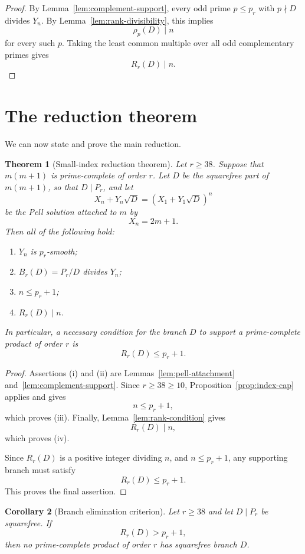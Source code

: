 \documentclass[11pt]{article}
\newtheorem{theorem}{Theorem}[section]
\newtheorem{corollary}[theorem]{Corollary}
\theoremstyle{definition}
\begin{document}
\begin{proof}
By Lemma~\ref{lem:complement-support}, every odd prime $p\le p_r$ with $p\nmid D$ 
divides $Y_n$.  By Lemma~\ref{lem:rank-divisibility}, this implies
\[
        \rho_p(D)\mid n
\]
for every such $p$.  Taking the least common multiple over all odd complementary primes gives
\[
        R_r(D)\mid n.
\]
\end{proof}

\section{The reduction theorem}

We can now state and prove the main reduction.

\begin{theorem}[Small-index reduction theorem]\label{thm:reduction}
Let $r\ge 38$.  Suppose that $m(m+1)$ is prime-complete of order $r$.  Let $D$ be the 
squarefree part of $m(m+1)$, so that $D\mid P_r$, and let
\[
        X_n+Y_n\sqrt D=(X_1+Y_1\sqrt D)^n
\]
be the Pell solution attached to $m$ by
\[
        X_n=2m+1.
\]
Then all of the following hold:
\begin{enumerate}[label=\textup{(\roman*)}]
    \item $Y_n$ is $p_r$-smooth;
    \item $B_r(D)=P_r/D$ divides $Y_n$;
    \item $n\le p_r+1$;
    \item $R_r(D)\mid n$.
\end{enumerate}
In particular, a necessary condition for the branch $D$ to support a prime-complete 
product of order $r$ is
\[
        R_r(D)\le p_r+1.
\]
\end{theorem}

\begin{proof}
Assertions (i) and (ii) are Lemmas~\ref{lem:pell-attachment} and~\ref{lem:complement-support}.  
Since $r \ge 38 \ge 10$, Proposition~\ref{prop:index-cap} applies and gives
\[
        n \le p_r+1,
\]
which proves (iii).  Finally, Lemma~\ref{lem:rank-condition} gives
\[
        R_r(D) \mid n,
\]
which proves (iv).

Since $R_r(D)$ is a positive integer dividing $n$, and $n\le p_r+1$, any 
supporting branch must satisfy
\[
        R_r(D) \le p_r+1.
\]
This proves the final assertion.
\end{proof}

\begin{corollary}[Branch elimination criterion]\label{cor:branch-elimination}
Let $r \ge 38$ and let $D \mid P_r$ be squarefree.  If
\[
        R_r(D)>p_r+1,
\]
then no prime-complete product of order $r$ has squarefree branch $D$.
\end{corollary}
\end{document}
